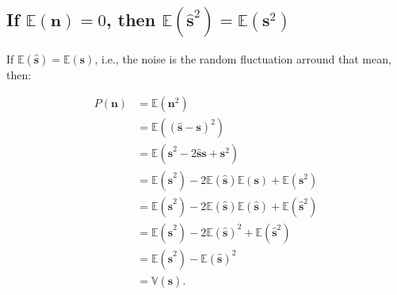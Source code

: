 \begin{subappendices}
\section{If $\mathbb{E}(\mathbf{n})=0$, then $\mathbb{E}(\hat{\mathbf{s}}^2)=\mathbb{E}(\mathbf{s}^2)$}
\label{sec:power_noise}
If $\mathbb{E}(\hat{\mathbf{s}})=\mathbb{E}(\mathbf{s})$, i.e.,
the noise is the random fluctuation arround that mean, then:

\begin{align*}
  P(\mathbf{n})
  & = \mathbb{E}(\mathbf{n}^2) \\
  & = \mathbb{E}\left((\hat{\mathbf{s}}-\mathbf{s})^2\right)\\
  & = \mathbb{E}(\hat{\mathbf{s}}^2 - 2\hat{\mathbf{s}}\mathbf{s} + \mathbf{s}^2) \\
  & = \mathbb{E}(\hat{\mathbf{s}}^2) -2\mathbb{E}(\hat{\mathbf{s}})\mathbb{E}(\mathbf{s}) + \mathbb{E}(\mathbf{s}^2) \\
  & = \mathbb{E}(\hat{\mathbf{s}}^2) -2\mathbb{E}(\hat{\mathbf{s}})\mathbb{E}(\hat{\mathbf{s}}) + \mathbb{E}(\hat{\mathbf{s}}^2) \\
  & = \mathbb{E}(\hat{\mathbf{s}}^2) -2\mathbb{E}(\hat{\mathbf{s}})^2 + \mathbb{E}(\hat{\mathbf{s}}^2) \\
  & = \mathbb{E}(\hat{\mathbf{s}}^2)-\mathbb{E}(\hat{\mathbf{s}})^2 \\
  & = \mathbb{V}(\hat{\mathbf{s}}).
\end{align*}



\end{subappendices}


